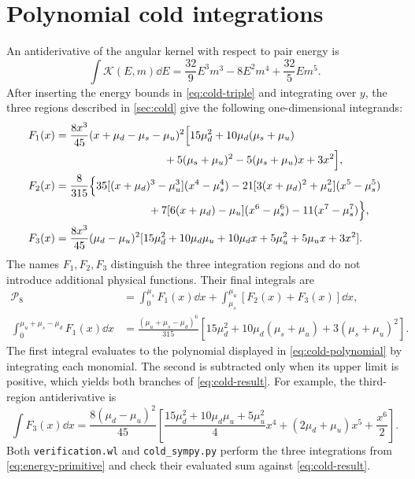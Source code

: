\section{Polynomial cold integrations}
\label{app:cold-algebra}
An antiderivative of the angular kernel with respect to pair energy is
\begin{equation}
 \int\mathcal K(E,m)\dd E
 =\frac{32}{9}E^3m^3-8E^2m^4+\frac{32}{5}Em^5.
 \label{eq:energy-primitive}
\end{equation}
After inserting the energy bounds in \cref{eq:cold-triple} and integrating over \(y\), the three regions described in \cref{sec:cold} give the following one-dimensional integrands:
\begin{align}
 F_1(x)={}&\frac{8x^3}{45}(x+\mu_d-\mu_s-\mu_u)^2
 \Big[15\mu_d^2+10\mu_d(\mu_s+\mu_u)\notag\\
 &\hspace{30mm}+5(\mu_s+\mu_u)^2-5(\mu_s+\mu_u)x+3x^2\Big],
 \label{eq:region-one}\\
 F_2(x)={}&\frac{8}{315}\Big\{
 35[(x+\mu_d)^3-\mu_u^3](x^4-\mu_s^4)
 -21[3(x+\mu_d)^2+\mu_u^2](x^5-\mu_s^5)\notag\\
 &\hspace{25mm}+7[6(x+\mu_d)-\mu_u](x^6-\mu_s^6)
 -11(x^7-\mu_s^7)\Big\},
 \label{eq:region-two}\\
 F_3(x)={}&\frac{8x^3}{45}(\mu_d-\mu_u)^2
 [15\mu_d^2+10\mu_d\mu_u+10\mu_d x
 +5\mu_u^2+5\mu_u x+3x^2].
 \label{eq:region-three}
\end{align}
The names \(F_1,F_2,F_3\) distinguish the three integration regions and do not introduce additional physical functions.
Their final integrals are
\begin{align}
 \mathcal P_8
 &=\int_0^{\mu_s}F_1(x)\dd x
   +\int_{\mu_s}^{\mu_u}[F_2(x)+F_3(x)]\dd x,
 \label{eq:cold-large-integrated}\\
 \int_0^{\mu_u+\mu_s-\mu_d}F_1(x)\dd x
 &=\frac{(\mu_u+\mu_s-\mu_d)^6}{315}
 [15\mu_d^2+10\mu_d(\mu_s+\mu_u)+3(\mu_s+\mu_u)^2].
 \label{eq:cold-missing-integrated}
\end{align}
The first integral evaluates to the polynomial displayed in \cref{eq:cold-polynomial} by integrating each monomial.
The second is subtracted only when its upper limit is positive, which yields both branches of \cref{eq:cold-result}.
For example, the third-region antiderivative is
\begin{equation}
 \int F_3(x)\dd x=\frac{8(\mu_d-\mu_u)^2}{45}
 \left[\frac{15\mu_d^2+10\mu_d\mu_u+5\mu_u^2}{4}x^4
 +(2\mu_d+\mu_u)x^5+\frac{x^6}{2}\right].
 \label{eq:region-three-primitive}
\end{equation}
Both \texttt{verification.wl} and \texttt{cold\_sympy.py} perform the three integrations from \cref{eq:energy-primitive} and check their evaluated sum against \cref{eq:cold-result}.

